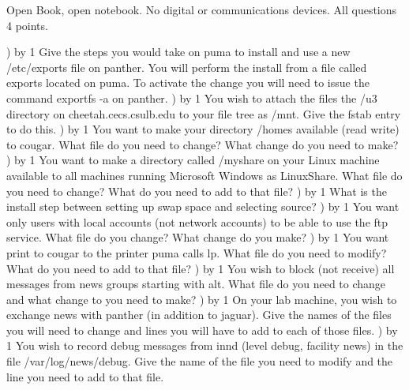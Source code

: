 
\parindent=0in
\nopagenumbers
\newcount\quesno
{}
\def\ques{\number\quesno) \advance\quesno by 1}
\def\aspace{\vskip 1.5in}

Open Book, open notebook. No digital or communications devices.
All questions 4 points.

\ques
Give the steps you would take on {\ltt{}puma} to install and use
a new {\ltt{}/etc/exports} file on {\ltt{}panther}.
You will perform the install from a file called {\ltt{}exports}
located on {\ltt{}puma}.
To activate the change you will need to issue the command
{\ltt{}exportfs -a} on {\ltt{}panther}.
\vskip 2.4in
\ques
You wish to attach the files the
{\ltt{}/u3} directory on {\ltt{}cheetah.cecs.csulb.edu}
to your file tree as {\ltt{}/mnt}.
Give the {\ltt{}fstab} entry to do this.
\vskip 0.6in
\ques
You want to make your directory 
{\ltt{}/homes}
available (read write) to {\ltt{}cougar}.
What file do you need to change?
What change do you need to make?
\vskip 1.2in
\ques
You want to make a directory called {\ltt{}/myshare} on your
Linux machine available to all machines running Microsoft Windows as
{\ltt{}LinuxShare}.
What file do you need to change?
What do you need to add to that file?
\vskip 1.2in
\vfill\eject
\ques
What is the install step between setting up swap space and selecting source?
\vskip 0.8in
\ques
You want only users with local accounts (not network accounts) to
be able to use the ftp service.
What file do you change? What change do you make?
\vskip 1.0in
\ques
You want print to {\ltt{}cougar} to the printer puma calls {\ltt{}lp}.
What file do you need to modify?
What do you need to add to that file?
\vskip 1.2in
\ques
You wish to block (not receive) all messages from news groups starting
with {\ltt{}alt.}
What file do you need to change and what change to you need to make?
\vskip 1.2in
\ques
On your lab machine, you wish to exchange news with {\ltt{}panther}
(in addition to {\ltt{}jaguar}).
Give the names of the files you will need to change and lines you
will have to add to each of those files.
\vskip 2.2in
\vfill\eject
\ques
You wish to record debug messages from {\ltt{}innd}
(level {\ltt{}debug}, facility {\ltt{}news}) in
the file {\ltt{}/var/log/news/debug}.
Give the name of the file you need to modify and the line you need to
add to that file.
\vskip 1.0in

